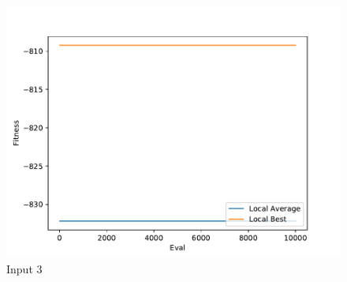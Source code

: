 \documentclass{standalone}
\begin{document}
\begin{figure}[!htb]
	\caption{Input 3}
	\label{fig:graph_3042}
	\includegraphics[width=\textwidth]{../graphs/graphs/3042.pdf}
\end{figure}
\end{document}

